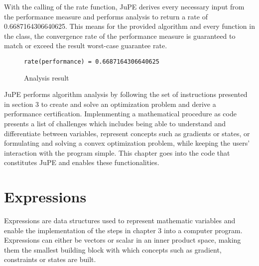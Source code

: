 With the calling of the rate function, JuPE derives every necessary input from the performance measure and performs analysis to return a rate of 0.6687164306640625. This means for the provided algorithm and every function in the class, the convergence rate of the performance measure is guaranteed to match or exceed the result worst-case guarantee rate.
 
\begin{figure}[hbtp]
\begin{lstlisting}
rate(performance) = 0.6687164306640625
\end{lstlisting}
\caption{Analysis result}
\label{ex_result}
\end{figure}

JuPE performs algorithm analysis by following the set of instructions presented in section 3 to create and solve an optimization problem and derive a performance certification. Implenmenting a mathematical procedure as code presents a list of challenges which includes being able to understand and differentiate between variables, represent concepts such as gradients or states, or formulating and solving a convex optimization problem, while keeping the users' interaction with the program simple. This chapter goes into the code that constitutes JuPE and enables these functionalities.

\section{Expressions}

Expressions are data structures used to represent mathematic variables and enable the implementation of the steps in chapter 3 into a computer program. Expressions can either be vectors or scalar in an inner product space, making them the smallest building block with which concepts such as gradient, constraints or states are built.

